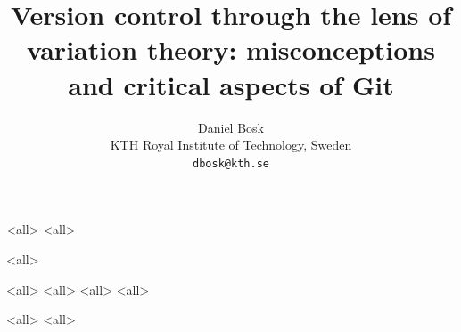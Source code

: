 \documentclass[ignoreframetext]{beamer}
\begin{document}
\title{%
  Version control through the lens of variation theory:
  misconceptions and critical aspects of Git%
}
\author{%
  Daniel Bosk
  \\KTH Royal Institute of Technology, Sweden
  \\\texttt{dbosk@kth.se}
}

\mode*

\begin{frame}
  \maketitle
\end{frame}

\begin{abstract}
  
\end{abstract}

\begin{frame}
  \tableofcontents[subsectionstyle=hide,subsubsectionstyle=hide]
\end{frame}

\mode<all>{}
\mode<all>{}

\mode<all>{}

\mode<all>{}
\mode<all>{}
\mode<all>{}
\mode<all>{}

\mode<all>{}
\mode<all>{}

\begin{frame}[allowframebreaks]
\printbibliography
\end{frame}
\end{document}
